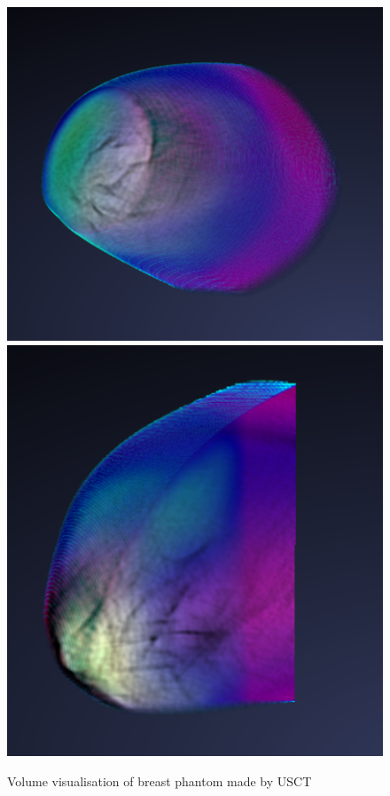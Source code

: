 \documentclass[twoside, english, 11pt]{report}
\begin{document}
\begin{figure}[!h]
\includegraphics[scale=0.4]{img/usct1}\includegraphics[scale=0.4335]{img/usct2}\\
\caption{Volume visualisation of breast phantom made by USCT\label{fig:usct}}
\end{figure}
\end{document}
